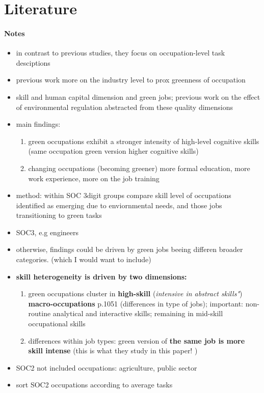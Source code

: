 \section{Literature}


\paragraph{Notes \cite{Consoli2016DoCapital}}
\begin{itemize}
	\item in contrast to previous studies, they focus on occupation-level task desciptions
	\item previous work more on the industry level to prox greenness of occupation 
	\item skill and human capital dimension and green jobs; previous work on the effect of environmental regulation abstracted from these quality dimensions
	\item main findings:
	\begin{enumerate}
		\item green occupations exhibit a stronger intensity of high-level cognitive skills (\ar same occupation green version higher cognitive skills)
		\item changing occupations (becoming greener) more formal education, more work experience, more on the job training
	\end{enumerate}
\item method: within SOC 3digit groups compare skill level of occupations identified as emerging due to enviornmental needs, and those jobs transitioning to green tasks
\item SOC3, e.g engineers
\item otherwise, findings could be driven by green jobs beeing differen broader categories. (which I would want to include)
\item \textbf{skill heterogeneity is driven by two dimensions: }
\begin{enumerate}
	\item green occupations cluster in \textbf{high-skill} (\textit{intensive in abstract skills"}) \textbf{macro-occupations} p.1051 (\ar differences in type of jobs); important: non-routine analytical and interactive skills; remaining in mid-skill occupational skills
	\item differences within job types: green version of \textbf{the same job is more skill intense} (this is what they study in this paper! )
\end{enumerate}
\item SOC2 not included occupations: agriculture, public sector
\item sort SOC2 occupations according to average tasks



\end{itemize}
